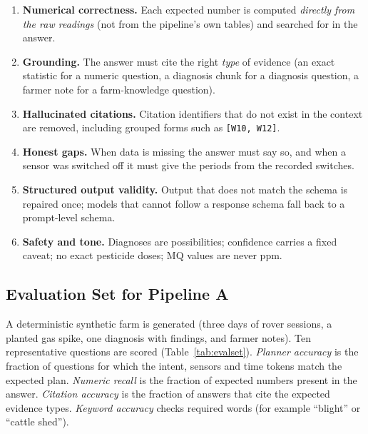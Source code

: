 \begin{enumerate}
\item \textbf{Numerical correctness.} Each expected number is computed \emph{directly from the raw readings} (not from the pipeline's own
      tables) and searched for in the answer.
\item \textbf{Grounding.} The answer must cite the right \emph{type} of evidence (an exact statistic for a numeric question, a diagnosis
      chunk for a diagnosis question, a farmer note for a farm-knowledge question).
\item \textbf{Hallucinated citations.} Citation identifiers that do not exist in the context are removed, including grouped forms
      such as \texttt{[W10, W12]}.
\item \textbf{Honest gaps.} When data is missing the answer must say so, and when a sensor was switched off it must give the periods
      from the recorded switches.
\item \textbf{Structured output validity.} Output that does not match the schema is repaired once; models that cannot follow a response
      schema fall back to a prompt-level schema.
\item \textbf{Safety and tone.} Diagnoses are possibilities; confidence carries a fixed caveat; no exact pesticide doses; MQ values are never ppm.
\end{enumerate}

\subsection{Evaluation Set for Pipeline A}

A deterministic synthetic farm is generated (three days of rover sessions, a planted gas spike, one diagnosis with findings, and farmer
notes). Ten representative questions are scored (Table~\ref{tab:evalset}). \emph{Planner accuracy} is the fraction of questions for which the intent, sensors and time tokens
match the expected plan. \emph{Numeric recall} is the fraction of expected numbers present in the answer. \emph{Citation accuracy} is
the fraction of answers that cite the expected evidence types. \emph{Keyword accuracy} checks required words (for example
``blight'' or ``cattle shed'').


